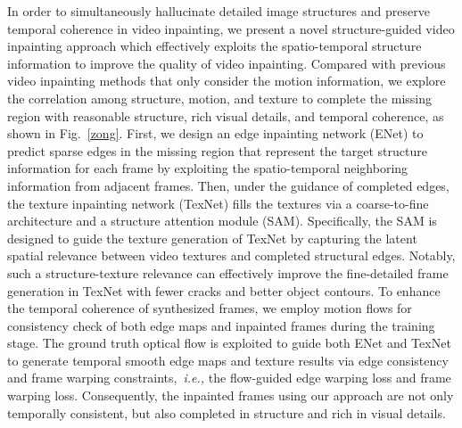 In order to simultaneously hallucinate detailed image structures and preserve temporal coherence in video inpainting, we present a novel structure-guided video inpainting approach which effectively exploits the spatio-temporal structure information to improve the quality of video inpainting.  
%
Compared with previous video inpainting methods that only consider the motion information, we explore the correlation among structure, motion, and texture to complete the missing region with reasonable structure, rich visual details, and temporal coherence, as shown in Fig.~\ref{zong}.
First, we design an edge inpainting network (ENet) to predict sparse edges in the missing region that represent the target structure information for each frame by exploiting the spatio-temporal neighboring information from adjacent frames.
Then, under the guidance of completed edges, the texture inpainting network (TexNet) fills the textures via a coarse-to-fine architecture and a structure attention module (SAM).
Specifically, the SAM is designed to guide the texture generation of TexNet by capturing the latent spatial relevance between video textures and completed structural edges.
Notably, such a structure-texture relevance can effectively improve the fine-detailed frame generation in TexNet with fewer cracks and better object contours.
To enhance the temporal coherence of synthesized frames, we employ motion flows for consistency check of both edge maps and inpainted frames during the training stage.
%
The ground truth optical flow is exploited to guide both ENet and TexNet to generate temporal smooth edge maps and texture results via edge consistency and frame warping constraints,~\emph{i.e.,} the flow-guided edge warping loss and frame warping loss.
Consequently, the inpainted frames using our approach are not only temporally consistent, but also completed in structure and rich in visual details.



